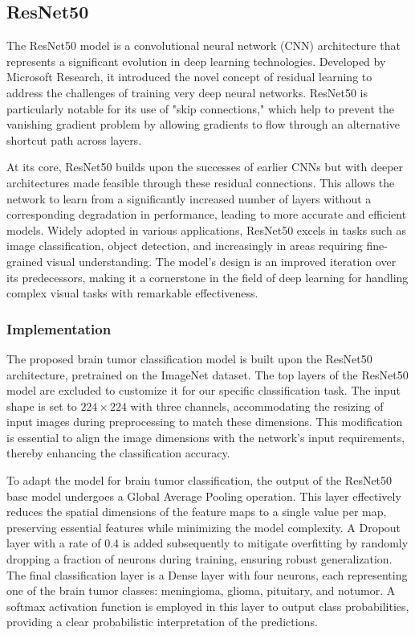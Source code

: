 \subsection{ResNet50}\label{resnet50}

The ResNet50 model is a convolutional neural network (CNN) architecture that represents a significant evolution in deep learning technologies. Developed by Microsoft Research, it introduced the novel concept of residual learning to address the challenges of training very deep neural networks. ResNet50 is particularly notable for its use of "skip connections," which help to prevent the vanishing gradient problem by allowing gradients to flow through an alternative shortcut path across layers.

At its core, ResNet50 builds upon the successes of earlier CNNs but with deeper architectures made feasible through these residual connections. This allows the network to learn from a significantly increased number of layers without a corresponding degradation in performance, leading to more accurate and efficient models. Widely adopted in various applications, ResNet50 excels in tasks such as image classification, object detection, and increasingly in areas requiring fine-grained visual understanding. The model's design is an improved iteration over its predecessors, making it a cornerstone in the field of deep learning for handling complex visual tasks with remarkable effectiveness.

\subsubsection{Implementation}

The proposed brain tumor classification model is built upon the ResNet50 architecture, pretrained on the ImageNet dataset. The top layers of the ResNet50 model are excluded to customize it for our specific classification task. The input shape is set to $224\times224$ with three channels, accommodating the resizing of input images during preprocessing to match these dimensions. This modification is essential to align the image dimensions with the network's input requirements, thereby enhancing the classification accuracy.

To adapt the model for brain tumor classification, the output of the ResNet50 base model undergoes a Global Average Pooling operation. This layer effectively reduces the spatial dimensions of the feature maps to a single value per map, preserving essential features while minimizing the model complexity. A Dropout layer with a rate of 0.4 is added subsequently to mitigate overfitting by randomly dropping a fraction of neurons during training, ensuring robust generalization. The final classification layer is a Dense layer with four neurons, each representing one of the brain tumor classes: meningioma, glioma, pituitary, and notumor. A softmax activation function is employed in this layer to output class probabilities, providing a clear probabilistic interpretation of the predictions.

